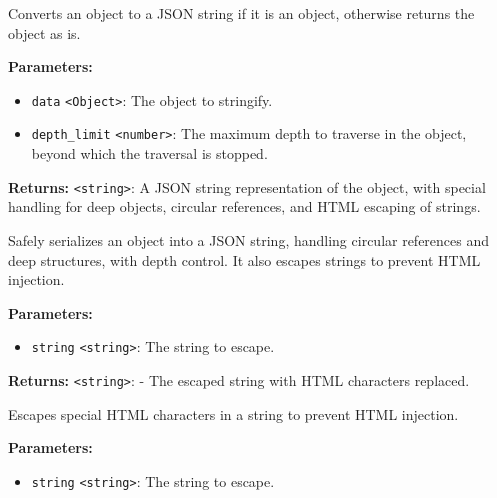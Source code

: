 \documentclass[12pt,a4paper]{article}
\begin{document}
\noindent Converts an object to a JSON string if it is an object, otherwise returns the object as is.

\vspace{5mm}
\noindent {}


\noindent \textbf{Parameters:}
\begin{itemize}
  \item \texttt{data} \texttt{<Object>}: The object to stringify.
  \item \texttt{depth\_limit} \texttt{<number>}: The maximum depth to traverse in the object, beyond which the traversal is stopped.
\end{itemize}

\noindent \textbf{Returns:} \texttt{<string>}: A JSON string representation of the object, with special handling for deep objects, circular references, and HTML escaping of strings.

\noindent Safely serializes an object into a JSON string, handling circular references and deep structures, with depth control.
It also escapes strings to prevent HTML injection.

\vspace{5mm}
\noindent {}


\noindent \textbf{Parameters:}
\begin{itemize}
  \item \texttt{string} \texttt{<string>}: The string to escape.
\end{itemize}

\noindent \textbf{Returns:} \texttt{<string>}: - The escaped string with HTML characters replaced.

\noindent Escapes special HTML characters in a string to prevent HTML injection.

\vspace{5mm}
\noindent {}


\noindent \textbf{Parameters:}
\begin{itemize}
  \item \texttt{string} \texttt{<string>}: The string to escape.
\end{itemize}
\end{document}
